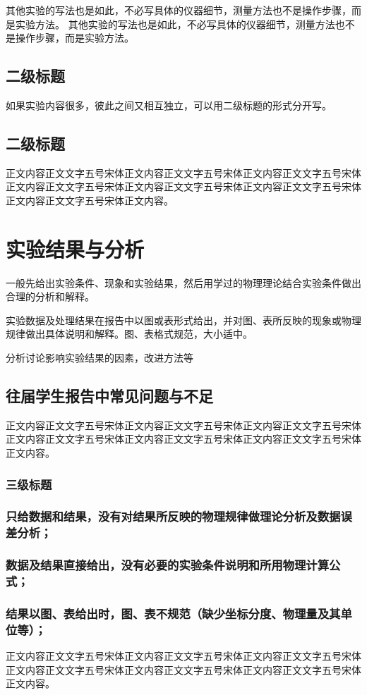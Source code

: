 \documentclass{iceli}
\begin{document}
其他实验的写法也是如此，不必写具体的仪器细节，测量方法也不是操作步骤，而是实验方法。
其他实验的写法也是如此，不必写具体的仪器细节，测量方法也不是操作步骤，而是实验方法。

\subsection{二级标题}
如果实验内容很多，彼此之间又相互独立，可以用二级标题的形式分开写。

\subsection{二级标题}
正文内容正文文字五号宋体正文内容正文文字五号宋体正文内容正文文字五号宋体正文内容正文文字五号宋体正文内容正文文字五号宋体正文内容正文文字五号宋体正文内容正文文字五号宋体正文内容。

\section{实验结果与分析}
一般先给出实验条件、现象和实验结果，然后用学过的物理理论结合实验条件做出合理的分析和解释。

实验数据及处理结果在报告中以图或表形式给出，并对图、表所反映的现象或物理规律做出具体说明和解释。图、表格式规范，大小适中。

分析讨论影响实验结果的因素，改进方法等

\subsection{往届学生报告中常见问题与不足}
正文内容正文文字五号宋体正文内容正文文字五号宋体正文内容正文文字五号宋体正文内容正文文字五号宋体正文内容正文文字五号宋体正文内容正文文字五号宋体正文内容。
\subsubsection{三级标题}
\subsubsection{只给数据和结果，没有对结果所反映的物理规律做理论分析及数据误差分析；}
\subsubsection{数据及结果直接给出，没有必要的实验条件说明和所用物理计算公式；}
\subsubsection{结果以图、表给出时，图、表不规范（缺少坐标分度、物理量及其单位等）；}
正文内容正文文字五号宋体正文内容正文文字五号宋体正文内容正文文字五号宋体正文内容正文文字五号宋体正文内容正文文字五号宋体正文内容正文文字五号宋体正文内容。
\end{document}
